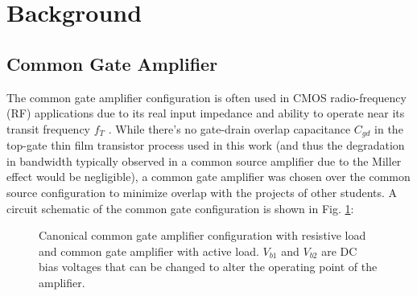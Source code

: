 \documentclass[conference]{IEEEtran}
\begin{document}
\section{Background}

\subsection{Common Gate Amplifier}

The common gate amplifier configuration is often used in CMOS radio-frequency (RF) applications due to its real input impedance and ability to operate near its transit frequency $f_T$ \cite{Razavi}.
While there's no gate-drain overlap capacitance $C_{gd}$ in the top-gate thin film transistor process used in this work
(and thus the degradation in bandwidth typically observed in a common source amplifier due to the Miller effect would be negligible),
a common gate amplifier was chosen over the common source configuration to minimize overlap with the projects of other students.
A circuit schematic of the common gate configuration is shown in Fig. \ref{fig:commongate}:

\begin{figure}[htbp]
    \centering
    \quad
    \caption{Canonical common gate amplifier configuration with resistive load and common gate amplifier with active load. $V_{b1}$ and $V_{b2}$ are DC bias voltages that can be changed to alter the operating point of the amplifier.}
    \label{fig:commongate}
\end{figure}
\end{document}
